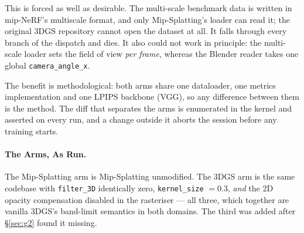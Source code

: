 This is forced as well as desirable. The multi-scale benchmark data is written
in mip-NeRF's multiscale format, and only Mip-Splatting's loader can read it;
the original 3DGS repository cannot open the dataset at all. It falls
through every branch of the dispatch and dies. It also could not work in
principle: the multi-scale loader sets the field of view \emph{per frame},
whereas the Blender reader takes one global \texttt{camera\_angle\_x}.

The benefit is methodological: both arms share one dataloader, one metrics
implementation and one LPIPS backbone (VGG), so any difference between them is the method. The diff that separates the arms is
enumerated in the kernel and asserted on every run, and a change outside it
aborts the session before any training starts.


\paragraph{The Arms, As Run.} The Mip-Splatting arm is Mip-Splatting unmodified. The 3DGS arm is the
same codebase with \texttt{filter\_3D} identically zero, \texttt{kernel\_size}
$=0.3$, \emph{and} the 2D opacity compensation disabled in the rasteriser --- all
three, which together are vanilla 3DGS's band-limit semantics in both domains.
The third was added after \S\ref{sec:g2} found it missing.

